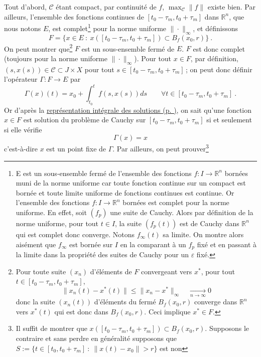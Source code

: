 \begin{preuve}
Tout d'abord, \(\mathcal{C}\) étant compact, par continuité de \(f\),
\(\max_\mathcal{C}\|f\|\) existe bien. Par ailleurs, l'ensemble des
fonctions continues de \([t_0-\tau_m,t_0+\tau_m]\) dans
\(\mathbb{R}^n\), que nous notons \(E\), est complet\footnote{E est un
  sous-ensemble fermé de l'ensemble des fonctions
  \(f:I\to \mathbb{R}^n\) bornées muni de la norme uniforme car toute
  fonction continue sur un compact est bornée et toute limite uniforme
  de fonctions continues est continue. Or l'ensemble des fonctions
  \(f:I\to \mathbb{R}^n\) bornées est complet pour la norme uniforme. En
  effet, soit \((f_p)\) une suite de Cauchy. Alors par définition de la
  norme uniforme, pour tout \(t\in I\), la suite \((f_p(t))\) est de
  Cauchy dans \(\mathbb{R}^n\) qui est complet donc converge. Notons
  \(f_\infty(t)\) sa limite. On montre alors aisément que \(f_\infty\)
  est bornée sur \(I\) en la comparant à un \(f_p\) fixé et en passant à
  la limite dans la propriété des suites de Cauchy pour un
  \(\varepsilon\) fixé.} pour la norme uniforme \(\|\cdot\|_\infty\), et
définissons
\[
F = \{x\in E \: : \: x(\left[t_0-\tau_m,t_0+\tau_m \right])\subset B_f(x_0,r) \} \ .
\] On peut montrer que\footnote{Pour toute suite \((x_n)\) d'éléments de
  \(F\) convergeant vers \(x^*\), pour tout
  \(t\in [t_0-\tau_m,t_0+\tau_m]\), \[
  \|x_n(t)-x^*(t)\|\leq \|x_n-x^*\|_{\infty} \quad \underset{n\to \infty}{\longrightarrow} 0
  \] donc la suite \((x_n(t))\) d'éléments du fermé \(B_f(x_0,r)\)
  converge dans \(\mathbb{R}^n\) vers \(x^*(t)\) qui est donc dans
  \(B_f(x_0,r)\). Ceci implique \(x^*\in F\).} \(F\) est un
sous-ensemble fermé de \(E\). \(F\) est donc complet (toujours pour la
norme uniforme \(\|\cdot\|_\infty\)). Pour tout \(x\in F\), par
définition, \((s,x(s))\in \mathcal{C}\subset J\times X\) pour tout
\(s\in \left[t_0-\tau_m,t_0+\tau_m \right]\)\,; on peut donc définir
l'opérateur \(\Gamma : F\to E\) par \[
\Gamma(x)(t) = x_0+\int_{t_0}^t f(s,x(s))ds \qquad \forall t\in \left[ t_0-\tau_m,t_0+\tau_m \right] \ .
\] Or d'après la \protect\hyperlink{theo_eq_integrale}{représentation
intégrale des solutions (p. \pageref*{theo_eq_integrale})}, on sait
qu'une fonction \(x\in F\) est solution du problème de Cauchy sur
\(\left[ t_0-\tau_m,t_0+\tau_m \right]\) si et seulement si elle vérifie
\[
\Gamma(x)=x
\] c'est-à-dire \(x\) est un point fixe de \(\Gamma\). Par ailleurs, on
peut prouver\footnote{Il suffit de montrer que
  \(x([t_0-\tau_m,t_0+\tau_m])\subset B_f(x_0,r)\). Supposons le
  contraire et sans perdre en généralité supposons que
  \(S := \{ t\in [t_0,t_0+\tau_m] \: : \: \|x(t)-x_0\|>r \}\) est non
}
\end{preuve}
